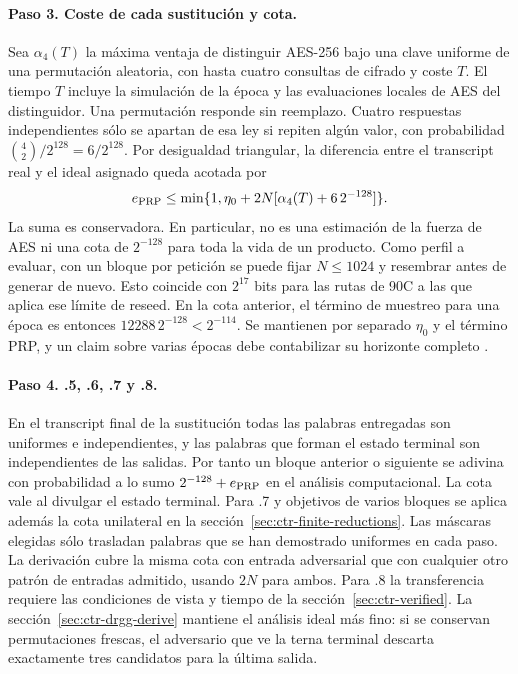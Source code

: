 \documentclass[11pt,a4paper]{article}
\begin{document}
\paragraph{Paso 3. Coste de cada sustitución y cota.}
Sea \(\alpha_4(T)\) la máxima ventaja de
distinguir AES-256 bajo una clave uniforme
de una permutación aleatoria, con hasta
cuatro consultas de cifrado y coste \(T\).
El tiempo \(T\) incluye la simulación
de la época y las evaluaciones locales
de AES del distinguidor.
Una permutación responde sin reemplazo.
Cuatro respuestas independientes sólo
se apartan de esa ley si repiten algún
valor, con probabilidad
\(\binom42/2^{128}=6/2^{128}\).
Por desigualdad triangular, la diferencia
entre el transcript real y el ideal
asignado queda acotada por
\begin{equation}
 e_{\rm PRP}
 \le \min\{1,\eta_0+2N[\alpha_4(T)+6\,2^{-128}]\}.
 \label{eq:ctr-prp-bound}
\end{equation}
La suma es conservadora. En particular,
no es una estimación de la fuerza de
AES ni una cota de \(2^{-128}\) para
toda la vida de un producto.
Como perfil a evaluar, con un bloque por petición se puede
fijar \(N\le 1024\) y resembrar antes de generar de nuevo.
Esto coincide con \(2^{17}\) bits para las rutas de 90C a
las que aplica ese límite de reseed. En la cota anterior,
el término de muestreo para una época es entonces
\(12288\,2^{-128}<2^{-114}\). Se mantienen por separado
\(\eta_0\) y el término PRP, y un claim sobre varias épocas
debe contabilizar su horizonte completo
\cite[§5.3(6) y §6.4.2(3)]{nist90c}.

\paragraph{Paso 4. .5, .6, .7 y .8.}
En el transcript final de la sustitución
todas las palabras entregadas son
uniformes e independientes, y las
palabras que forman el estado terminal
son independientes de las salidas.
Por tanto un bloque anterior o siguiente
se adivina con probabilidad a lo sumo
\(2^{-128}+e_{\rm PRP}\) en el análisis
computacional. La cota vale al divulgar
el estado terminal. Para .7 y objetivos de varios bloques se aplica además la cota unilateral en la sección~\ref{sec:ctr-finite-reductions}.
Las máscaras elegidas sólo trasladan
palabras que se han demostrado
uniformes en cada paso. La derivación
cubre la misma cota con entrada
adversarial que con cualquier otro
patrón de entradas admitido, usando
\(2N\) para ambos. Para .8 la transferencia requiere las condiciones de vista y tiempo de la sección~\ref{sec:ctr-verified}. La sección~\ref{sec:ctr-drgg-derive}
mantiene el análisis ideal más fino: si
se conservan permutaciones frescas,
el adversario que ve la terna terminal
descarta exactamente tres candidatos
para la última salida.
\end{document}
